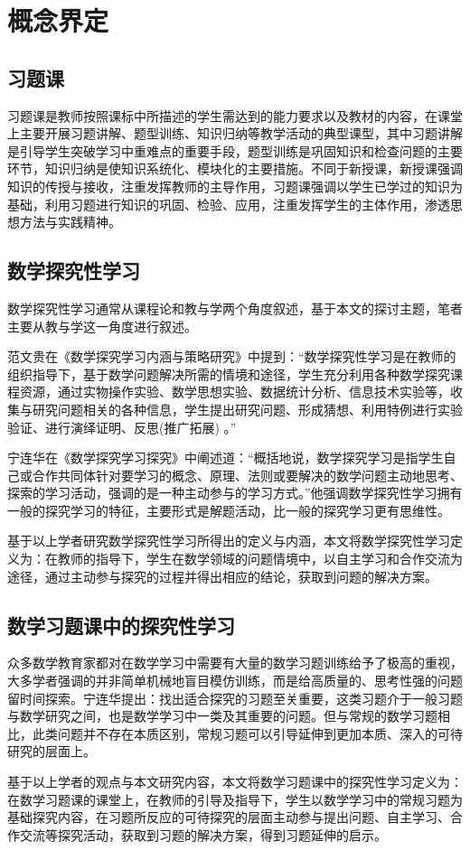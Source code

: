 \chapter{概念界定}


\section{习题课}

习题课是教师按照课标中所描述的学生需达到的能力要求以及教材的内容，在课堂上主要开展习题讲解、题型训练、知识归纳等教学活动的典型课型，其中习题讲解是引导学生突破学习中重难点的重要手段，题型训练是巩固知识和检查问题的主要环节，知识归纳是使知识系统化、模块化的主要措施。不同于新授课，新授课强调知识的传授与接收，注重发挥教师的主导作用，习题课强调以学生已学过的知识为基础，利用习题进行知识的巩固、检验、应用，注重发挥学生的主体作用，渗透思想方法与实践精神。



\section{数学探究性学习}

数学探究性学习通常从课程论和教与学两个角度叙述，基于本文的探讨主题，笔者主要从教与学这一角度进行叙述。

范文贵在《数学探究学习内涵与策略研究》中提到：“数学探究性学习是在教师的组织指导下，基于数学问题解决所需的情境和途径，学生充分利用各种数学探究课程资源，通过实物操作实验、数学思想实验、数据统计分析、信息技术实验等，收集与研究问题相关的各种信息，学生提出研究问题、形成猜想、利用特例进行实验验证、进行演绎证明、反思(推广拓展) \cite{范文贵2005数学探究学习内涵与策略研究}。”

宁连华在《数学探究学习探究》中阐述道：“概括地说，数学探究学习是指学生自己或合作共同体针对要学习的概念、原理、法则或要解决的数学问题主动地思考、探索的学习活动，强调的是一种主动参与的学习方式\cite{宁连华2004数学探究学习研究}。”他强调数学探究性学习拥有一般的探究学习的特征，主要形式是解题活动，比一般的探究学习更有思维性。

基于以上学者研究数学探究性学习所得出的定义与内涵，本文将数学探究性学习定义为：在教师的指导下，学生在数学领域的问题情境中，以自主学习和合作交流为途径，通过主动参与探究的过程并得出相应的结论，获取到问题的解决方案。



\section{数学习题课中的探究性学习}

众多数学教育家都对在数学学习中需要有大量的数学习题训练给予了极高的重视，大多学者强调的并非简单机械地盲目模仿训练，而是给高质量的、思考性强的问题留时间探索。宁连华提出：找出适合探究的习题至关重要，这类习题介于一般习题与数学研究之间，也是数学学习中一类及其重要的问题。但与常规的数学习题相比，此类问题并不存在本质区别，常规习题可以引导延伸到更加本质、深入的可待研究的层面上\cite{宁连华2004数学学科探究学习的特征及其指导策略}。

基于以上学者的观点与本文研究内容，本文将数学习题课中的探究性学习定义为：在数学习题课的课堂上，在教师的引导及指导下，学生以数学学习中的常规习题为基础探究内容，在习题所反应的可待探究的层面主动参与提出问题、自主学习、合作交流等探究活动，获取到习题的解决方案，得到习题延伸的启示。